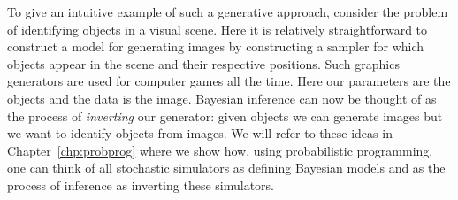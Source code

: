 To give an intuitive example of such a generative approach, consider the problem of identifying objects in
a visual scene.  Here it is relatively straightforward to construct a model for generating images by
constructing a sampler for which objects appear in the scene and their respective positions.  Such
graphics generators are used for computer games all the time.  Here our parameters are the objects and
the data is the image.  Bayesian inference can now be thought of as the process of \emph{inverting} our generator:
given objects we can generate images but we want to identify objects from images.  We will refer
to these ideas in Chapter~\ref{chp:probprog} where we show how, using probabilistic programming,
one can think of all stochastic simulators as defining Bayesian models and as the process of inference as
inverting these simulators.